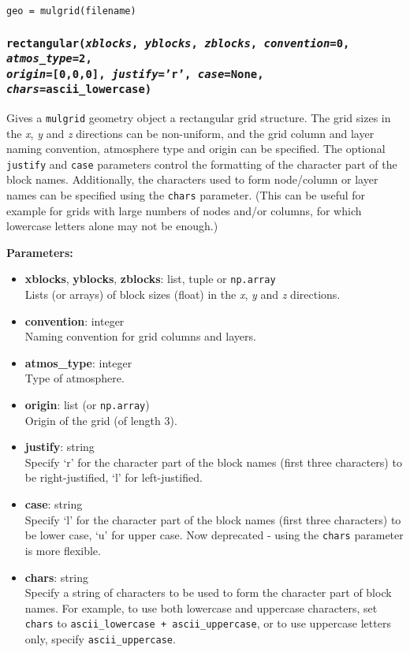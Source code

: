 \begin{lstlisting}
geo = mulgrid(filename)
\end{lstlisting}

\begin{snugshade}
\subsubsection{\texttt{rectangular(\emph{xblocks}, \emph{yblocks}, \emph{zblocks}, \emph{convention}=0, \emph{atmos\_type}=2,\\
    \emph{origin}=[0,0,0], \emph{justify}='r', \emph{case}=None, \emph{chars}=ascii\_lowercase)}}\end{snugshade}
\label{sec:mulgrid:rectangular}

Gives a \texttt{mulgrid} geometry object a rectangular grid structure.  The grid sizes in the \emph{x}, \emph{y} and \emph{z} directions can be non-uniform, and the grid column and layer naming convention, atmosphere type and origin can be specified.  The optional \texttt{justify} and \texttt{case} parameters control the formatting of the character part of the block names.  Additionally, the characters used to form node/column or layer names can be specified using the \texttt{chars} parameter.  (This can be useful for example for grids with large numbers of nodes and/or columns, for which lowercase letters alone may not be enough.)

\textbf{Parameters:}
\begin{itemize}
\item \textbf{xblocks}, \textbf{yblocks}, \textbf{zblocks}: list, tuple or \texttt{np.array}\\
  Lists (or arrays) of block sizes (float) in the \emph{x}, \emph{y} and \emph{z} directions.
\item \textbf{convention}: integer\\
  Naming convention for grid columns and layers.
\item \textbf{atmos\_type}: integer\\
  Type of atmosphere.
\item \textbf{origin}: list (or \texttt{np.array})\\
  Origin of the grid (of length 3).
\item \textbf{justify}: string\\
  Specify `r' for the character part of the block names (first three characters) to be right-justified, `l' for left-justified.
\item \textbf{case}: string\\
  Specify `l' for the character part of the block names (first three characters) to be lower case, `u' for upper case.  Now deprecated - using the \texttt{chars} parameter is more flexible.
\item \textbf{chars}: string\\
  Specify a string of characters to be used to form the character part of block names.  For example, to use both lowercase and uppercase characters, set \texttt{chars} to \texttt{ascii\_lowercase + ascii\_uppercase}, or to use uppercase letters only, specify \texttt{ascii\_uppercase}.
\end{itemize}

